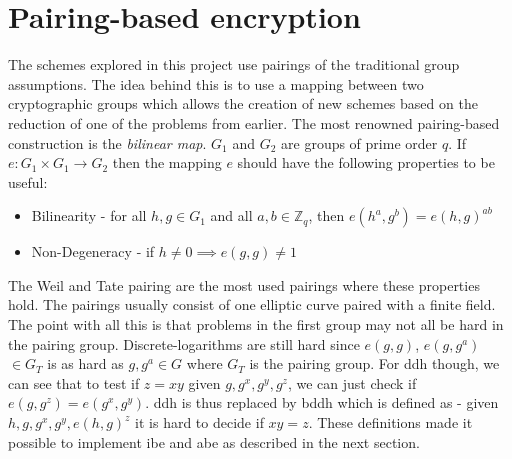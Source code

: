 \section{Pairing-based encryption}\label{parings}
 The schemes explored in this project use pairings \cite{pairing-survey} of the traditional group assumptions. The idea behind this is to use a mapping between two cryptographic groups which allows the creation of new schemes based on the reduction of one of the problems from earlier. The most renowned pairing-based construction is the \emph{bilinear map}. $G_1$ and $G_2$ are groups of prime order $q$. If $e: G_1 \times G_1 \rightarrow G_2$ then the mapping $e$ should have the following properties to be useful: 
\begin{itemize}
\item Bilinearity - for all $h, g \in G_1$ and all $a,b \in \mathbb{Z}_q$, then $e(h^a, g^b) = e(h, g)^{ab}$
\item Non-Degeneracy - if $h \neq 0 \implies e(g,g) \neq 1$
\end{itemize}
The Weil and Tate pairing are the most used pairings where these properties hold. The pairings usually consist of one elliptic curve paired with a finite field. 
The point with all this is that problems in the first group may not all be hard in the pairing group. Discrete-logarithms are still hard since $e(g,g)$, $e(g,g^a)$ $\in G_T$ is as hard as $g,g^a \in G$ where $G_T$ is the pairing group.
For \gls{ddh} though, we can see that to test if $z=xy$ given $g, g^x, g^y, g^z$, we can just check if $e(g, g^z) = e(g^x, g^y)$. \Gls{ddh} is thus replaced by \gls{bddh} which is defined as - given $h, g, g^x, g^y, e(h,g)^z$ it is hard to decide if $xy = z$. These definitions made it possible to implement \gls{ibe} and \gls{abe} as described in the next section.


